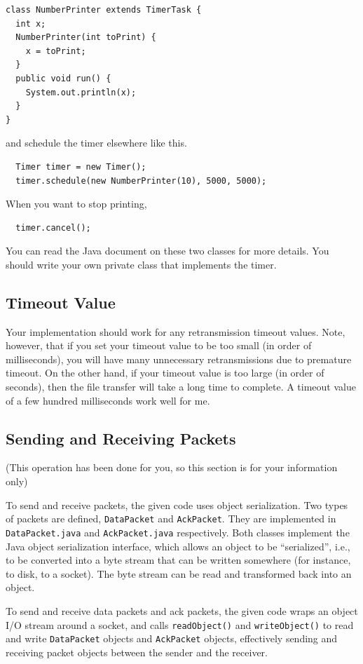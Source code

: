 \documentclass[a4paper,11pt]{exam}
\begin{document}
\begin{verbatim}
class NumberPrinter extends TimerTask {
  int x;
  NumberPrinter(int toPrint) {
    x = toPrint;
  } 
  public void run() {
    System.out.println(x);
  }
}
\end{verbatim}
and schedule the timer elsewhere like this.
\begin{verbatim}
  Timer timer = new Timer();
  timer.schedule(new NumberPrinter(10), 5000, 5000);
\end{verbatim}
When you want to stop printing,
\begin{verbatim}
  timer.cancel();
\end{verbatim}

You can read the Java document on these two classes for more details.
You should write your own private class that implements the timer.

\subsection*{Timeout Value}

Your implementation should work for any retransmission timeout values.  Note, however, that if you set your timeout value to be too small (in order of milliseconds), you will have many unnecessary retransmissions due to premature timeout.  On the other hand, if your timeout value is too large (in order of seconds), then the file transfer will take a long time to complete.  A timeout value of a few hundred milliseconds work well for me.

\subsection*{Sending and Receiving Packets}

(This operation has been done for you, so this section is for your information only)

To send and receive packets, the given code uses object serialization.  Two types of packets are defined, \texttt{DataPacket} and \texttt{AckPacket}.  They are implemented in \texttt{DataPacket.java} and \texttt{AckPacket.java} respectively.  Both classes implement the Java object serialization interface, which allows an object to be ``serialized'', i.e., to be converted into a byte stream that can be written somewhere (for instance, to disk, to a socket).  The byte stream can be read and transformed back into an object.

To send and receive data packets and ack packets, the given code wraps an object I/O stream around a socket, and calls \texttt{readObject()} and \texttt{writeObject()} to read and write \texttt{DataPacket} objects and \texttt{AckPacket} objects, effectively sending and receiving packet objects between the sender and the receiver.
\end{document}
